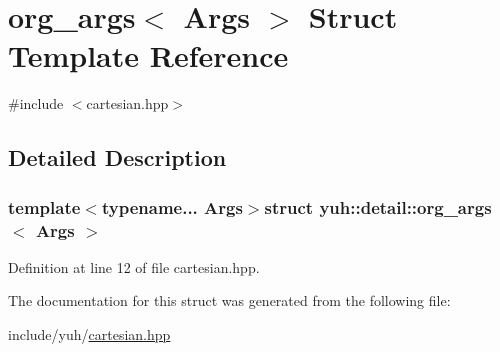 \hypertarget{structyuh_1_1detail_1_1org__args}{\section{org\-\_\-args$<$ \-Args $>$ \-Struct \-Template \-Reference}
\label{d6/d2b/structyuh_1_1detail_1_1org__args}
}


{\ttfamily \#include $<$cartesian.\-hpp$>$}



\subsection{\-Detailed \-Description}
\subsubsection*{template$<$typename... \-Args$>$struct yuh\-::detail\-::org\-\_\-args$<$ Args $>$}



\-Definition at line 12 of file cartesian.\-hpp.



\-The documentation for this struct was generated from the following file\-:\begin{DoxyCompactItemize}
\item 
include/yuh/\hyperlink{cartesian_8hpp}{cartesian.\-hpp}\end{DoxyCompactItemize}
